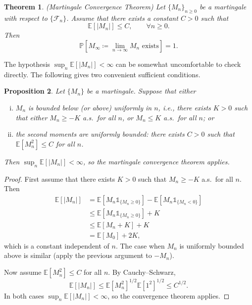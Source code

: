 \documentclass{tufte-handout}
\newcommand*\E{\mathbb{E}}
\renewcommand*\P{\mathbb{P}}
\newtheorem{thm}{Theorem}[subsection]
\newtheorem{prop}[thm]{Proposition}
\theoremstyle{definition}
\begin{document}
\begin{thm}
	(Martingale Convergence Theorem) Let $\{M_n\}_{n \ge 0}$ be a martingale with
	respect to $\{\mathscr{F}_n\}$. Assume that there exists a constant $C>0$ such
	that
	\[
		\E\left[ \left| M_n \right| \right] \le C, \qquad \forall n \ge 0
	.\] 
	Then
	\[
		\P\left[ M_\infty \coloneqq \lim_{n \to \infty} M_n \text{ exists} \right] = 1
	.\] 
\end{thm}


The hypothesis $\sup_n \E\left[ |M_n| \right] < \infty$ can be somewhat
uncomfortable to check directly.  The following gives two convenient sufficient
conditions.

\begin{prop}
	Let $\{M_n\}$ be a martingale. Suppose that either
	\begin{enumerate}[(i)]
		\item $M_n$ is bounded below (or above) uniformly in $n$, i.e., there exists
		      $K>0$ such that either $M_n \ge -K$ a.s.\ for all $n$, or $M_n \le K$
		      a.s.\ for all $n$; or
		\item the second moments are uniformly bounded: there exists $C>0$ such that
		      $\E\left[ M_n^2 \right] \le C$ for all $n$.
	\end{enumerate}
	Then $\sup_{n} \E\left[ |M_n| \right] < \infty$, so the martingale convergence
	theorem applies.
\end{prop}

\begin{proof}
	First assume that there exists $K>0$ such that $M_n \ge -K$ a.s.\ for all $n$.
	Then
	\begin{align*}
		\E\left[ |M_n| \right]
		&= \E\left[ M_n \mathds{1}_{\{M_n \ge 0\}} \right]
		  - \E\left[ M_n \mathds{1}_{\{M_n < 0\}} \right] \\
		&\le \E\left[ M_n \mathds{1}_{\{M_n \ge 0\}} \right] + K \\
		&\le \E\left[ M_n + K \right] + K \\
		&= \E\left[ M_0 \right] + 2K,
	\end{align*}
	which is a constant independent of $n$. The case when $M_n$ is uniformly
	bounded above is similar (apply the previous argument to $-M_n$).

	Now assume $\E\left[ M_n^2 \right] \le C$ for all $n$. By Cauchy–Schwarz,
	\[
		\E\left[ |M_n| \right]
		\le \E\left[ M_n^2 \right]^{1/2} \E\left[ 1^2 \right]^{1/2}
		\le C^{1/2}
	.\] 
	In both cases $\sup_n \E\left[ |M_n| \right] < \infty$, so the convergence
	theorem applies.
\end{proof}
\end{document}
